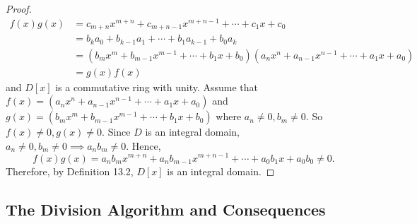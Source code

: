 \documentclass{article}
\newtheorem{theorem}{Theorem}[section]
\theoremstyle{definition}
\begin{document}
\begin{proof}
\begin{align*}
          f(x)g(x) &= c_{m+n}x^{m+n}+c_{m+n-1}x^{m+n-1}+\cdots+c_1x+c_0 \\
          &= b_ka_0+b_{k-1}a_1+\cdots+b_1a_{k-1}+b_0a_k \\
          &= (b_mx^m+b_{m-1}x^{m-1}+\cdots+b_1x+b_0)(a_nx^n+a_{n-1}x^{n-1}+\cdots+a_1x+a_0) \\
          &= g(x)f(x)
      \end{align*}
      and $D[x]$ is a commutative ring with unity. Assume that $f(x)=(a_nx^n+a_{n-1}x^{n-1}+\cdots+a_1x+a_0)$ and $g(x)=(b_mx^m+b_{m-1}x^{m-1}+\cdots+b_1x+b_0)$ where $a_n\neq0,b_m\neq0$. So $f(x)\neq0, g(x)\neq0$. Since $D$ is an integral domain, $a_n\neq0,b_m\neq0 \implies a_nb_m\neq0$. Hence,
      \begin{equation*}
          f(x)g(x)=a_nb_mx^{m+n}+a_nb_{m-1}x^{m+n-1}+\cdots+a_0b_1x+a_0b_0\neq0.
      \end{equation*}
      Therefore, by Definition 13.2, $D[x]$ is an integral domain.
\end{proof}

\subsection{The Division Algorithm and Consequences}
\end{document}
